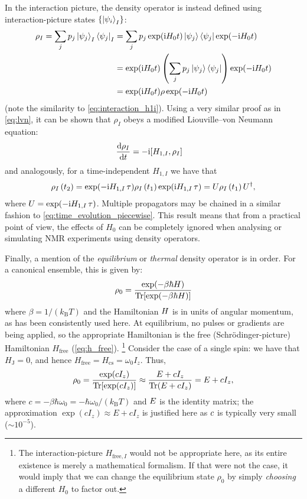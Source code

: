 In the interaction picture, the density operator is instead defined using interaction-picture states $\{\ket{\psi_i}_I\}$:
\begin{align}
    \label{eq:density_matrix_interaction}
    \rho_I = \sum_j p_j \ket{\psi_j}_I \bra{\psi_j}_I
           &= \sum_j p_j \exp(\mathrm{i} H_0 t)\ket{\psi_j} \bra{\psi_j} \exp(-\mathrm{i} H_0 t) \notag \\
           &= \exp(\mathrm{i} H_0 t) \left(\sum_j p_j \ket{\psi_j} \bra{\psi_j}\right) \exp(-\mathrm{i} H_0 t) \notag \\
           &= \exp(\mathrm{i} H_0 t) \rho \exp(-\mathrm{i} H_0 t)
\end{align}
(note the similarity to \cref{eq:interaction_h1i}).
Using a very similar proof as in \cref{eq:lvn}, it can be shown that $\rho_I$ obeys a modified Liouville--von Neumann equation:
\begin{align}
    \label{eq:lvn_interaction}
    \frac{\mathrm{d}\rho_I}{\mathrm{d}t} &= -\mathrm{i}[H_{1,I}, \rho_I]
\end{align}
and analogously, for a time-independent $H_{1,I}$ we have that
\begin{align}
    \label{eq:lvn_interaction_integrated}
    \rho_I\,(t_2) = \exp(-\mathrm{i} H_{1,I}\,\tau)\rho_I\,(t_1)\exp(\mathrm{i} H_{1,I}\,\tau) = U\rho_I\,(t_1) \, U^\dagger,
\end{align}
where $U = \exp(-\mathrm{i} H_{1,I}\,\tau)$.
Multiple propagators may be chained in a similar fashion to \cref{eq:time_evolution_piecewise}.
This result means that from a practical point of view, the effects of $H_0$ can be completely ignored when analysing or simulating NMR experiments using density operators.

Finally, a mention of the \textit{equilibrium} or \textit{thermal} density operator is in order.
For a canonical ensemble, this is given by:
\begin{equation}
    \label{eq:thermal_density_operator}
    \rho_0 = \frac{\exp(-\beta\hbar H)}{\operatorname{Tr}[\exp(-\beta\hbar H)]}
\end{equation}
where $\beta = 1/(k_\mathrm{B}T)$ and the Hamiltonian $H\/$ is in units of angular momentum, as has been consistently used here.
At equilibrium, no pulses or gradients are being applied, so the appropriate Hamiltonian is the free (Schr\"odinger-picture) Hamiltonian $H_\text{free}$ (\cref{eq:h_free}).%
\footnote{The interaction-picture $H_{\text{free},I}$ would not be appropriate here, as its entire existence is merely a mathematical formalism. If that were not the case, it would imply that we can change the equilibrium state $\rho_0$ by simply \textit{choosing} a different $H_0$ to factor out.}
Consider the case of a single spin: we have that $H_\text{J} = 0$, and hence $H_\text{free} = H_\text{cs} = \omega_0 I_z$. Thus,
\begin{equation}
    \label{eq:nmr_equilibrium_rho}
    \rho_0 = \frac{\exp(cI_z)}{\operatorname{Tr}[\exp(cI_z)]} \approx \frac{E + cI_z}{\operatorname{Tr}(E + cI_z)} = E + cI_z,
\end{equation}
where $c = -\beta\hbar\omega_0 = -\hbar\omega_0/(k_\mathrm{B}T)$ and $E\/$ is the identity matrix; the approximation $\exp(cI_z) \approx E + cI_z$ is justified here as $c\/$ is typically very small ($\sim 10^{-5}$).

